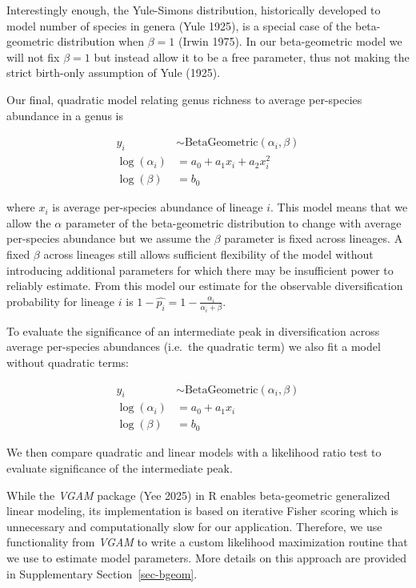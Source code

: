 \documentclass[
  letterpaper,
  DIV=11,
  numbers=noendperiod]{scrartcl}
\newcommand{\ssec}[1]{Supplementary Section~\ref{#1}}
\begin{document}
Interestingly enough, the Yule-Simons distribution, historically
developed to model number of species in genera (Yule 1925), is a special
case of the beta-geometric distribution when \(\beta = 1\) (Irwin 1975).
In our beta-geometric model we will not fix \(\beta = 1\) but instead
allow it to be a free parameter, thus not making the strict birth-only
assumption of Yule (1925).

Our final, quadratic model relating genus richness to average
per-species abundance in a genus is

\begin{align}
y_i &\sim \text{BetaGeometric}(\alpha_i, \beta) \\
\log(\alpha_i) &= a_0 + a_1 x_i + a_2 x_i^2 \label{eq-link} \\
\log(\beta) &= b_0
\end{align}

where \(x_i\) is average per-species abundance of lineage \(i\). This
model means that we allow the \(\alpha\) parameter of the beta-geometric
distribution to change with average per-species abundance but we assume
the \(\beta\) parameter is fixed across lineages. A fixed \(\beta\)
across lineages still allows sufficient flexibility of the model without
introducing additional parameters for which there may be insufficient
power to reliably estimate. From this model our estimate for the
observable diversification probability for lineage \(i\) is
\(1 - \hat{p_i} = 1 - \frac{\alpha_i}{\alpha_i + \beta}\).

To evaluate the significance of an intermediate peak in diversification
across average per-species abundances (i.e.~the quadratic term) we also
fit a model without quadratic terms:

\begin{align}
y_i &\sim \text{BetaGeometric}(\alpha_i, \beta) \\
\log(\alpha_i) &= a_0 + a_1 x_i \\
\log(\beta) &= b_0
\end{align}

We then compare quadratic and linear models with a likelihood ratio test
to evaluate significance of the intermediate peak.

While the \emph{VGAM} package (Yee 2025) in R enables beta-geometric
generalized linear modeling, its implementation is based on iterative
Fisher scoring which is unnecessary and computationally slow for our
application. Therefore, we use functionality from \emph{VGAM} to write a
custom likelihood maximization routine that we use to estimate model
parameters. More details on this approach are provided in
\ssec{sec-bgeom}.
\end{document}
